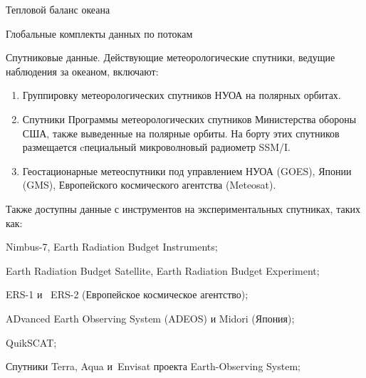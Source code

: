 \begin{chapter}{Тепловой баланс океана}
\begin{section}{Глобальные комплекты данных по потокам}
\begin{paragraph}{Спутниковые данные.}
Действующие метеорологические спутники, ведущие наблюдения за океаном,
включают:
%
\begin{enumerate}
\item
Группировку метеорологических спутников НУОА на полярных орбитах.
%

\item 
Спутники Программы метеорологических спутников Министерства обороны США,
также выведенные на полярные орбиты. На борту этих спутников размещается
cпециальный микроволновый радиометр SSM/I.
%

\item 
Геостационарные метеоспутники под управлением НУОА (GOES), Японии (GMS),
Европейского космического агентства (Meteosat).
%
\end{enumerate}
Также доступны данные с инструментов на экспериментальных спутниках, таких
как:
%
\begin{enumparen}
\item
Nimbus-7, Earth Radiation Budget Instruments;
%

\item 
Earth Radiation Budget Satellite, Earth Radiation Budget Experiment;
%

\item 
ERS-1 и ~ERS-2 (Европейское космическое агентство);
%

\item
ADvanced Earth Observing System (ADEOS) и Midori (Япония);
%

\item
QuikSCAT;
%

\item 
Спутники Terra, Aqua и~Envisat проекта Earth-Observing System;
%


\end{enumparen}
\end{paragraph}
\end{section}
\end{chapter}
